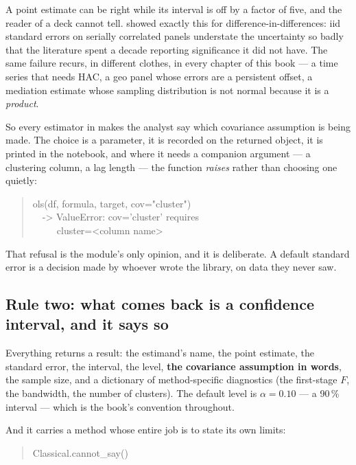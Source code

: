 A point estimate can be right while its interval is off by a factor of five, and the reader of a
deck cannot tell.  showed exactly this for difference-in-differences: iid
standard errors on serially correlated panels understate the uncertainty so badly that the
literature spent a decade reporting significance it did not have. The same failure recurs, in
different clothes, in every chapter of this book --- a time series that needs HAC, a geo panel
whose errors are a persistent offset, a mediation estimate whose sampling distribution is not
normal because it is a \emph{product}.

So every estimator in  makes the analyst say which covariance assumption is
being made. The choice is a parameter, it is recorded on the returned object, it is printed in the
notebook, and where it needs a companion argument --- a clustering column, a lag length --- the
function \emph{raises} rather than choosing one quietly:

\begin{quote}\footnotesize\ttfamily
ols(df, formula, target, cov="cluster")\\
\ \ -> ValueError: cov='cluster' requires\\
\ \ \ \ \ cluster=<column name>
\end{quote}

That refusal is the module's only opinion, and it is deliberate. A default standard error is a
decision made by whoever wrote the library, on data they never saw.

\subsection*{Rule two: what comes back is a confidence interval, and it says so}

Everything returns a  result: the estimand's name, the point estimate, the standard
error, the interval, the level, \textbf{the covariance assumption in words}, the sample size, and a
dictionary of method-specific diagnostics (the first-stage $F$, the bandwidth, the number of
clusters). The default level is $\alpha = 0.10$ --- a 90\,\% interval --- which is the book's
convention throughout.

And it carries a method whose entire job is to state its own limits:

\begin{quote}\small\ttfamily
Classical.cannot\_say()
\end{quote}

